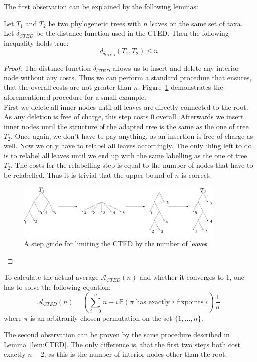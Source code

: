 The first observation can be explained by the following lemmas:
\begin{lem}\label{lem:CTED}
	Let $T_1$ and $T_2$ be two phylogenetic trees with $n$ leaves on the same set of taxa. Let $\delta_{CTED}$ be the distance function used in the CTED. Then the following inequality holds true:
	$$ d_{\delta_{CTED}}(T_1,T_2) \leq n$$
\end{lem}
\begin{proof}
	The distance function $\delta_{CTED}$ allows us to insert and delete any interior node without any costs. Thus we can perform a standard procedure that ensures, that the overall costs are not greater than $n$. Figure~\ref{fig:CTED} demonstrates the aforementioned procedure for a small example.\\
	First we delete all inner nodes until all leaves are directly connected to the root. As any deletion is free of charge, this step costs $0$ overall. Afterwards we insert inner nodes until the structure of the adapted tree is the same as the one of tree $T_2$. Once again, we don't have to pay anything, as an insertion is free of charge as well. Now we only have to relabel all leaves accordingly. The only thing left to do is to relabel all leaves until we end up with the same labelling as the one of tree $T_2$. The costs for the relabelling step is equal to the number of nodes that have to be relabelled. Thus it is trivial that the upper bound of $n$ is correct.
	\begin{figure}[!h]
		\centering
		\includegraphics[width=0.90\textwidth]{figures/CTED.png}
		\caption{A step guide for limiting the CTED by the number of leaves.}
		\label{fig:CTED}
	\end{figure}
\end{proof}
\begin{rem}
	To calculate the actual average $\mathcal{A}_{CTED}(n)$ and whether it converges to $1$, one has to solve the following equation:
	$$\mathcal{A}_{CTED}(n) = (\sum_{i = 0}^n \, n - i \, \mathbb{P}(\pi \text{ has exactly $i$ fixpoints})) \frac{1}{n}$$
	where $\pi$ is an arbitrarily chosen permutation on the set $\{1,...,n\}$. 
\end{rem}
The second observation can be proven by the same procedure described in Lemma~\ref{lem:CTED}. The only difference is, that the first two steps both cost exactly $n-2$, as this is the number of interior nodes other than the root. 

